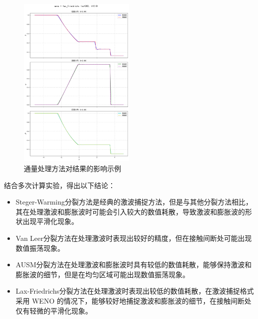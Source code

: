 \documentclass[UTF8]{ctexart}
\begin{document}
\begin{figure}
    \includegraphics[width=0.5\textwidth]{lax_friedrichs.png}
    \caption{通量处理方法对结果的影响示例}
    \label{fig:flux_effect}
\end{figure}
结合多次计算实验，得出以下结论：
\begin{itemize}
    \item Steger-Warming分裂方法是经典的激波捕捉方法，但是与其他分裂方法相比，其在处理激波和膨胀波时可能会引入较大的数值耗散，导致激波和膨胀波的形状出现平滑化现象。
    \item Van Leer分裂方法在处理激波时表现出较好的精度，但在接触间断处可能出现数值振荡现象。
    \item AUSM分裂方法在处理激波和膨胀波时具有较低的数值耗散，能够保持激波和膨胀波的细节，但是在均匀区域可能出现数值振荡现象。
    \item Lax-Friedrichs分裂方法在处理激波时表现出较低的数值耗散，在激波捕捉格式采用 WENO 的情况下，能够较好地捕捉激波和膨胀波的细节，在接触间断处仅有轻微的平滑化现象。
\end{itemize}
\end{document}
